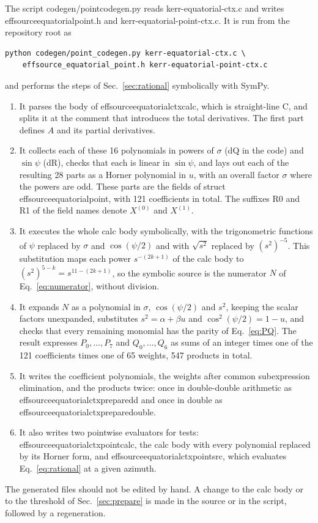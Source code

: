 \documentclass[11pt]{article}
\newcommand{\codeus}{\textunderscore\allowbreak}
\newcommand{\codehy}{-\allowbreak}
\newcommand{\code}[1]{{\ttfamily\let\_\codeus\let\-\codehy #1}}
\begin{document}
The script \code{codegen/point\_codegen.py} reads \code{kerr-equatorial-ctx.c}
and writes \code{effsource\_equatorial\_point.h} and
\code{kerr\-equatorial\-point\-ctx.c}. It is run from the repository root as
\begin{verbatim}
python codegen/point_codegen.py kerr-equatorial-ctx.c \
    effsource_equatorial_point.h kerr-equatorial-point-ctx.c
\end{verbatim}
and performs the steps of Sec.~\ref{sec:rational} symbolically with SymPy.
\begin{enumerate}
  \item It parses the body of \code{effsource\_equatorial\_ctx\_calc}, which is
    straight-line C, and splits it at the comment that introduces the total
    derivatives. The first part defines $A$ and its partial derivatives.
  \item It collects each of these 16 polynomials in powers of $\sigma$
    (\code{dQ} in the code) and $\sin\psi$ (\code{dR}), checks that each is
    linear in $\sin\psi$, and lays out each of the resulting 28 parts as a
    Horner polynomial in $u$, with an overall factor $\sigma$ where the powers
    are odd. These parts are the fields of \code{struct
    effsource\_equatorial\_point}, with 121 coefficients in total. The suffixes
    \code{\_R0} and \code{\_R1} of the field names denote $X^{(0)}$ and
    $X^{(1)}$.
  \item It executes the whole calc body symbolically, with the trigonometric
    functions of $\psi$ replaced by $\sigma$ and $\cos(\psi/2)$ and with
    $\sqrt{s^2}$ replaced by $(s^2)^{-5}$. This substitution maps each power
    $s^{-(2k+1)}$ of the calc body to $(s^2)^{5-k}=s^{11-(2k+1)}$, so the
    symbolic source is the numerator $N$ of Eq.~\eqref{eq:numerator}, without
    division.
  \item It expands $N$ as a polynomial in $\sigma$, $\cos(\psi/2)$ and $s^2$,
    keeping the scalar factors unexpanded, substitutes $s^2=\alpha+\beta u$ and
    $\cos^2(\psi/2)=1-u$, and checks that every remaining monomial has the
    parity of Eq.~\eqref{eq:PQ}. The result expresses $P_0,\dots,P_7$ and
    $Q_0,\dots,Q_6$ as sums of an integer times one of the 121 coefficients
    times one of 65 weights, 547 products in total.
  \item It writes the coefficient polynomials, the weights after common
    subexpression elimination, and the products twice: once in double-double
    arithmetic as \code{effsource\_equatorial\_ctx\_prepare\_dd} and once in
    double as \code{effsource\_equatorial\_ctx\_prepare\_double}.
  \item It also writes two pointwise evaluators for tests:
    \code{effsource\_equatorial\_ctx\_point\_calc}, the calc body with every
    polynomial replaced by its Horner form, and
    \code{effsource\_equatorial\_ctx\_point\_src}, which evaluates
    Eq.~\eqref{eq:rational} at a given azimuth.
\end{enumerate}
The generated files should not be edited by hand. A change to the calc body or
to the threshold of Sec.~\ref{sec:prepare} is made in the source or in the
script, followed by a regeneration.
\end{document}
